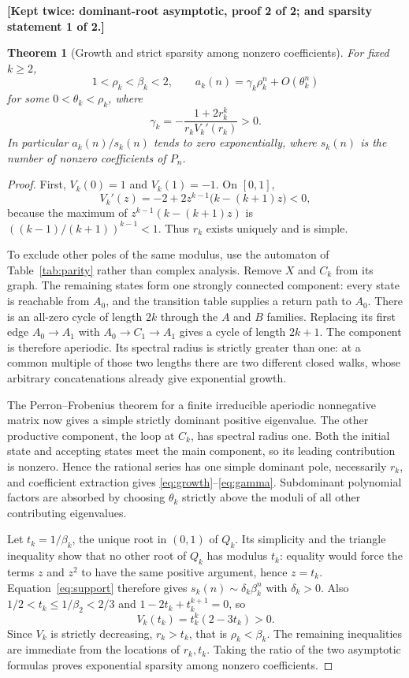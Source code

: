 \documentclass[11pt,letterpaper]{article}
\numberwithin{equation}{section}
\newtheorem{theorem}{Theorem}[section]
\theoremstyle{definition}
\theoremstyle{remark}
\begin{document}
\noindent\textbf{[Kept twice: dominant-root asymptotic, proof 2 of 2; and
sparsity statement 1 of 2.]}

\begin{theorem}[Growth and strict sparsity among nonzero coefficients]
\label{thm:growth}
For fixed $k\ge2$,
\begin{equation}
 1<\rho_k<\beta_k<2,
 \qquad
 a_k(n)=\gamma_k\rho_k^n+O(\theta_k^n)
 \label{eq:growth}
\end{equation}
for some $0<\theta_k<\rho_k$, where
\begin{equation}
 \gamma_k=-\frac{1+2r_k^k}{r_kV_k'(r_k)}>0 .
 \label{eq:gamma}
\end{equation}
In particular $a_k(n)/s_k(n)$ tends to zero exponentially, where $s_k(n)$
is the number of \emph{nonzero} coefficients of $P_n$.
\end{theorem}
\begin{proof}
First, $V_k(0)=1$ and $V_k(1)=-1$. On $[0,1]$,
\[
 V_k'(z)=-2+2z^{k-1}\bigl(k-(k+1)z\bigr)<0,
\]
because the maximum of $z^{k-1}(k-(k+1)z)$ is $((k-1)/(k+1))^{k-1}<1$.
Thus $r_k$ exists uniquely and is simple.

To exclude other poles of the same modulus, use the automaton of
Table~\ref{tab:parity} rather than complex analysis. Remove $X$ and $C_k$
from its graph. The remaining states form one strongly connected component:
every state is reachable from $A_0$, and the transition table supplies a
return path to $A_0$. There is an all-zero cycle of length $2k$ through the
$A$ and $B$ families. Replacing its first edge $A_0\to A_1$ with
$A_0\to C_1\to A_1$ gives a cycle of length $2k+1$. The component is
therefore aperiodic. Its spectral radius is strictly greater than one: at a
common multiple of those two lengths there are two different closed walks,
whose arbitrary concatenations already give exponential growth.

The Perron--Frobenius theorem for a finite irreducible aperiodic
nonnegative matrix now gives a simple strictly dominant positive
eigenvalue. The other productive component, the loop at $C_k$, has spectral
radius one. Both the initial state and accepting states meet the main
component, so its leading contribution is nonzero. Hence the rational
series has one simple dominant pole, necessarily $r_k$, and coefficient
extraction gives \eqref{eq:growth}--\eqref{eq:gamma}. Subdominant
polynomial factors are absorbed by choosing $\theta_k$ strictly above the
moduli of all other contributing eigenvalues.

Let $t_k=1/\beta_k$, the unique root in $(0,1)$ of $Q_k$. Its simplicity
and the triangle inequality show that no other root of $Q_k$ has modulus
$t_k$: equality would force the terms $z$ and $z^2$ to have the same
positive argument, hence $z=t_k$. Equation~\eqref{eq:support} therefore
gives $s_k(n)\sim\delta_k\beta_k^n$ with $\delta_k>0$. Also
$1/2<t_k\le1/\beta_2<2/3$ and $1-2t_k+t_k^{k+1}=0$, so
\[
 V_k(t_k)=t_k^k(2-3t_k)>0 .
\]
Since $V_k$ is strictly decreasing, $r_k>t_k$, that is $\rho_k<\beta_k$.
The remaining inequalities are immediate from the locations of $r_k,t_k$.
Taking the ratio of the two asymptotic formulas proves exponential
sparsity among nonzero coefficients.
\end{proof}
\end{document}
